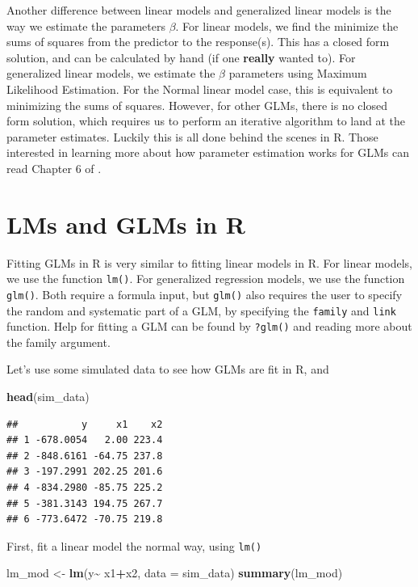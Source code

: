 \documentclass[
]{book}
\newenvironment{Shaded}{\begin{snugshade}}{\end{snugshade}}
\newcommand{\DataTypeTok}[1]{\textcolor[rgb]{0.13,0.29,0.53}{#1}}
\newcommand{\KeywordTok}[1]{\textcolor[rgb]{0.13,0.29,0.53}{\textbf{#1}}}
\newcommand{\NormalTok}[1]{#1}
\newcommand{\OperatorTok}[1]{\textcolor[rgb]{0.81,0.36,0.00}{\textbf{#1}}}
\newcommand{\StringTok}[1]{\textcolor[rgb]{0.31,0.60,0.02}{#1}}
\begin{document}
Another difference between linear models and generalized linear models is the way we estimate the parameters \(\beta\). For linear models, we find the minimize the sums of squares from the predictor to the response(s). This has a closed form solution, and can be calculated by hand (if one \textbf{really} wanted to). For generalized linear models, we estimate the \(\beta\) parameters using Maximum Likelihood Estimation. For the Normal linear model case, this is equivalent to minimizing the sums of squares. However, for other GLMs, there is no closed form solution, which requires us to perform an iterative algorithm to land at the parameter estimates. Luckily this is all done behind the scenes in R. Those interested in learning more about how parameter estimation works for GLMs can read Chapter 6 of \citep{dunn2018generalized}.

\hypertarget{lms-and-glms-in-r}{%
\section{LMs and GLMs in R}\label{lms-and-glms-in-r}}

Fitting GLMs in R is very similar to fitting linear models in R. For linear models, we use the function \texttt{lm()}. For generalized regression models, we use the function \texttt{glm()}. Both require a formula input, but \texttt{glm()} also requires the user to specify the random and systematic part of a GLM, by specifying the \texttt{family} and \texttt{link} function. Help for fitting a GLM can be found by \texttt{?glm()} and reading more about the family argument.

Let's use some simulated data to see how GLMs are fit in R, and

\begin{Shaded}
\begin{Highlighting}[]
\KeywordTok{head}\NormalTok{(sim\_data)}
\end{Highlighting}
\end{Shaded}

\begin{verbatim}
##           y     x1    x2
## 1 -678.0054   2.00 223.4
## 2 -848.6161 -64.75 237.8
## 3 -197.2991 202.25 201.6
## 4 -834.2980 -85.75 225.2
## 5 -381.3143 194.75 267.7
## 6 -773.6472 -70.75 219.8
\end{verbatim}

First, fit a linear model the normal way, using \texttt{lm()}

\begin{Shaded}
\begin{Highlighting}[]
\NormalTok{lm\_mod \textless{}{-}}\StringTok{ }\KeywordTok{lm}\NormalTok{(y}\OperatorTok{\textasciitilde{}}\StringTok{ }\NormalTok{x1}\OperatorTok{+}\NormalTok{x2, }\DataTypeTok{data =}\NormalTok{ sim\_data)}
\KeywordTok{summary}\NormalTok{(lm\_mod)}
\end{Highlighting}
\end{Shaded}
\end{document}
